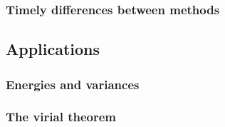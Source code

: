 \subsubsection{Timely differences between methods}













\subsection{Applications}

\subsubsection{Energies and variances}

\subsubsection{The virial theorem }